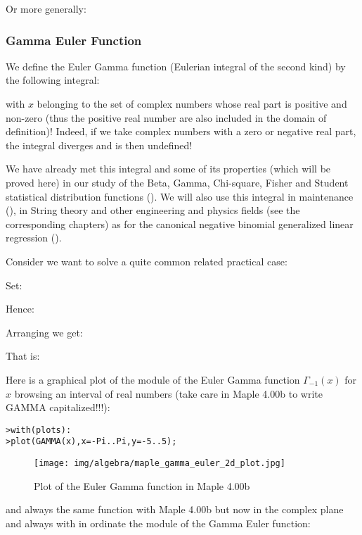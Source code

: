 	Or more generally:
	
	
	\subsubsection{Gamma Euler Function}\label{gamma euler function}
	We define the Euler Gamma function (Eulerian integral of the second kind) by the following integral:
	
	with $x$ belonging to the set of complex numbers whose real part is positive and non-zero (thus the positive real number are also included in the domain of definition)! Indeed, if we take complex numbers with a zero or negative real part, the integral diverges and is then undefined!
	
	\begin{tcolorbox}[title=Remark,colframe=black,arc=10pt]
		We have already met this integral and some of its properties (which will be proved here) in our study of the Beta, Gamma, Chi-square, Fisher and Student statistical distribution functions (). We will also use this integral in maintenance (), in String theory and other engineering and physics fields (see the corresponding chapters) as for the canonical negative binomial generalized linear regression ().
	\end{tcolorbox}
	Consider we want to solve a quite common related practical case:
	
	Set:
	
	Hence:
	
	Arranging we get:
	
	That is:
	
	
	Here is a graphical plot of the module of the Euler Gamma function $\Gamma_{-1}(x)$ for $x$ browsing an interval of real numbers (take care in Maple 4.00b to write GAMMA capitalized!!!):
	
	\texttt{>with(plots):\\}
	\texttt{>plot(GAMMA(x),x=-Pi..Pi,y=-5..5);}
	\begin{figure}[H]
		\centering
		\texttt{[image: img/algebra/maple\_gamma\_euler\_2d\_plot.jpg]}
		\caption{Plot of the Euler Gamma function in Maple 4.00b}
	\end{figure}
	and always the same function with Maple 4.00b but now in the complex plane and always with in ordinate the module of the Gamma Euler function:
	
